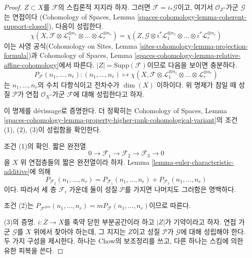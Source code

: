 \begin{proof}
$Z \subset X$를 $\mathcal{F}$의 스킴론적 지지라 하자. 그러면
$\mathcal{F} = i_*\mathcal{G}$이고, 여기서 $\mathcal{O}_Z$-가군
$\mathcal{G}$는 연접이다
(Cohomology of Spaces, Lemma
\ref{spaces-cohomology-lemma-coherent-support-closed}), 다음이 성립한다.
$$
\chi(X, \mathcal{F} \otimes
\mathcal{L}_1^{\otimes n_1} \otimes \ldots \otimes
\mathcal{L}_r^{\otimes n_r}) =
\chi(Z, \mathcal{G} \otimes
i^*\mathcal{L}_1^{\otimes n_1} \otimes \ldots \otimes
i^*\mathcal{L}_r^{\otimes n_r})
$$
이는 사영 공식(Cohomology on Sites, Lemma
\ref{sites-cohomology-lemma-projection-formula})과 Cohomology of Spaces, Lemma
\ref{spaces-cohomology-lemma-relative-affine-cohomology}에서 따른다.
$|Z| = \text{Supp}(\mathcal{F})$이므로 다음을 보이면 충분하다.
$$
P_\mathcal{F}(n_1, \ldots, n_r) :
(n_1, \ldots, n_r)
\longmapsto
\chi(X, \mathcal{F} \otimes
\mathcal{L}_1^{\otimes n_1} \otimes \ldots \otimes
\mathcal{L}_r^{\otimes n_r})
$$
는 $n_1, \ldots, n_r$의 수치 다항식이고 전차수가 $\dim(X)$ 이하이다.
위 명제가 참일 때 성질 $\mathcal{P}$가 연접 $\mathcal{O}_X$-가군
$\mathcal{F}$에 대해 성립한다고 하자.

\medskip\noindent
이 명제를 dévissage로 증명한다. 더 정확히는 Cohomology of Spaces, Lemma
\ref{spaces-cohomology-lemma-property-higher-rank-cohomological-variant}의 조건
(1), (2), (3)이 성립함을 확인한다.

\medskip\noindent
조건 (1)의 확인. 짧은 완전열
$$
0 \to \mathcal{F}_1 \to \mathcal{F}_2 \to \mathcal{F}_3 \to 0
$$
을 $X$ 위 연접층들의 짧은 완전열이라 하자. Lemma
\ref{lemma-euler-characteristic-additive}에 의해
$$
P_{\mathcal{F}_2}(n_1, \ldots, n_r) =
P_{\mathcal{F}_1}(n_1, \ldots, n_r) +
P_{\mathcal{F}_3}(n_1, \ldots, n_r)
$$
이다.
따라서 세 층 $\mathcal{F}_i$ 가운데 둘이 성질 $\mathcal{P}$를 가지면
나머지도 그러함은 명백하다.

\medskip\noindent
조건 (2)는
$P_{\mathcal{F}^{\oplus m}}(n_1, \ldots, n_r) =
mP_\mathcal{F}(n_1, \ldots, n_r)$이므로 따른다.

\medskip\noindent
(3)의 증명. $i : Z \to X$를 축약 닫힌 부분공간이라 하고 $|Z|$가
기약이라고 하자. 연접 가군 $\mathcal{G}$를 $X$ 위에서 찾아야 하는데,
그 지지는 $Z$이고 성질 $\mathcal{P}$가 $\mathcal{G}$에 대해 성립해야 한다.
두 가지 구성을
제시한다. 하나는 Chow의 보조정리를 쓰고, 다른 하나는 스킴에 의한 유한
피복을 쓴다.


\end{proof}
